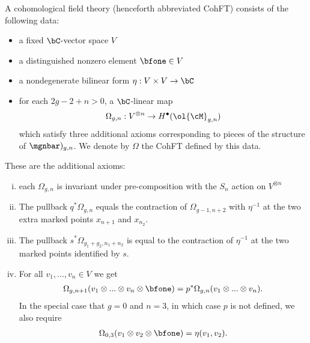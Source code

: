 \documentclass[raggedright, nofonts, notitlepage, openany, debug]{tufte-book}
\begin{document}
\begin{defn}
A cohomological field theory (henceforth abbreviated  CohFT) consists of the following data:
\begin{itemize}
  \item a fixed $\bC$-vector space $V$
  \item a distinguished nonzero element $\bfone \in V$
  \item a nondegenerate bilinear form $\eta: V\times V\to \bC$
  \item for each $2g - 2 + n >0$, a $\bC$-linear map
    \begin{align*}
      \Omega_{g,n} : V^{\otimes n}\to H^\bullet(\ol{\cM}_{g,n})
    \end{align*}
    which satisfy three additional axioms corresponding to pieces of the structure of $\mgnbar)_{g,n}$. We denote by $\Omega$ the CohFT defined by this data.
\end{itemize}
\end{defn}
These are the additional axioms:
\begin{enumerate}[(i)]
  \item each $\Omega_{g,n}$ is invariant under pre-composition with the $S_n$ action on $V^{\otimes n}$
  \item The pullback $q^*\Omega_{g,n}$ equals the contraction of $\Omega_{g-1,n+2}$ with $\eta^{-1}$ at the two extra marked points $x_{n+1}$ and $x_{n_2}$.  
  \item The pullback $s^*\Omega_{g_1+g_2,n_1+n_2}$ is equal to the contraction of $\eta^{-1}$ at the two marked points identified by $s$.
  \item For all $v_1,...,v_n\in V$ we get
    \begin{align*}
      \Omega_{g,n+1}(v_1\otimes...\otimes v_n \otimes \bfone) = p^*\Omega_{g,n}(v_1\otimes ... \otimes v_n).
    \end{align*}
    In the special case that $g = 0$ and $n = 3$, in which case $p$ is not defined, we also require
    \begin{align*}
      \Omega_{0,3}(v_1\otimes v_2\otimes \bfone) = \eta(v_1,v_2).
    \end{align*}
\end{enumerate}
\end{document}
